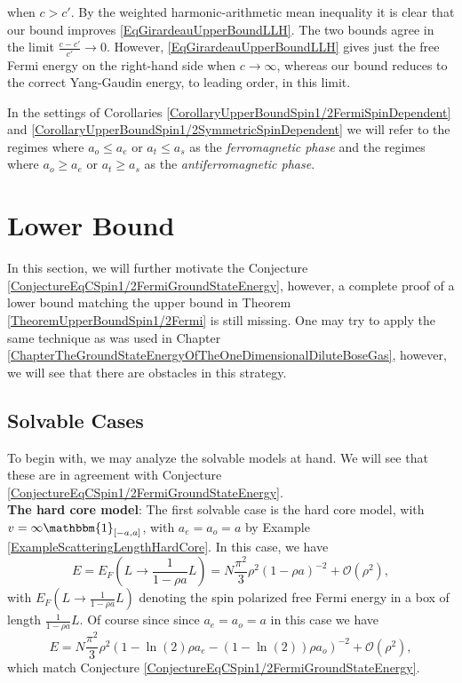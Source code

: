 when $ c>c' $. By the weighted harmonic-arithmetic mean inequality it is clear that our bound improves \eqref{EqGirardeauUpperBoundLLH}. The two bounds agree in the limit $ \frac{c-c'}{c'}\to0 $. However, \eqref{EqGirardeauUpperBoundLLH} gives just the free Fermi energy on the right-hand side when $ c\to\infty $, whereas our bound reduces to the correct Yang-Gaudin energy, to leading order, in this limit.
\begin{remark}
	In the settings of Corollaries \ref{CorollaryUpperBoundSpin1/2FermiSpinDependent} and \ref{CorollaryUpperBoundSpin1/2SymmetricSpinDependent} we will refer to the regimes where $ a_o\leq a_e $ or $ a_t\leq a_s $ as the \emph{ferromagnetic phase} and the regimes where $ a_o\geq a_e $ or $ a_t\geq a_s $ as the \emph{antiferromagnetic phase}. 
\end{remark}

\section{Lower Bound}
In this section, we will further motivate the Conjecture \ref{ConjectureEqCSpin1/2FermiGroundStateEnergy}, however, a complete proof of a lower bound matching the upper bound in Theorem \ref{TheoremUpperBoundSpin1/2Fermi} is still missing. One may try to apply the same technique as was used in Chapter \ref{ChapterTheGroundStateEnergyOfTheOneDimensionalDiluteBoseGas}, however, we will see that there are obstacles in this strategy.\\
\subsection{Solvable Cases}
To begin with, we may analyze the solvable models at hand. We will see that these are in agreement with Conjecture \ref{ConjectureEqCSpin1/2FermiGroundStateEnergy}.\\

\textbf{The hard core model}: The first solvable case is the hard core model, with $ v=\infty \mathbbm{1}_{[-a,a]} $, with $ a_e=a_o=a $ by Example \ref{ExampleScatteringLengthHardCore}. In this case, we have \begin{equation}
E=E_F\left(L\to \frac{1}{1-\rho a}L\right)=N\frac{\pi^2}{3}\rho^2\left(1-\rho a\right)^{-2}+\mathcal{O}(\rho^2),
\end{equation} 
with $ E_F\left(L\to \frac{1}{1-\rho a}L\right) $ denoting the spin polarized free Fermi energy in a box of length $ \frac{1}{1-\rho a}L $. Of course since since $ a_e=a_o=a $ in this case we have \begin{equation}
E=N\frac{\pi^2}{3}\rho^2\left(1-\ln(2)\rho a_e-(1-\ln(2))\rho a_o\right)^{-2}+\mathcal{O}(\rho^2),
\end{equation}
which match Conjecture \ref{ConjectureEqCSpin1/2FermiGroundStateEnergy}.\\

